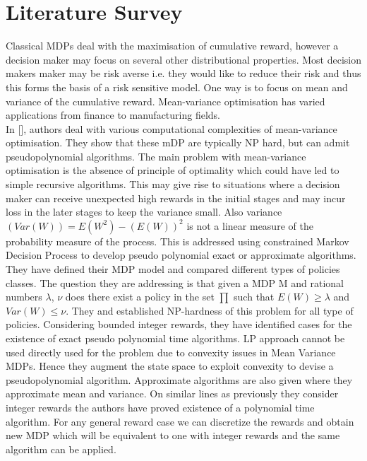 \documentclass[10pt,a4paper,oneside]{report}
\begin{document}
\chapter{Literature Survey}


\noindent Classical MDPs deal with the maximisation of cumulative reward, however a decision maker may focus on several other distributional properties. Most decision makers maker may be risk averse i.e. they would like to reduce their risk and thus this forms the basis of a risk sensitive model. 
One way is to focus on mean and variance of the cumulative reward. Mean-variance optimisation has varied applications from finance to manufacturing fields.\\

In [], authors deal with various computational complexities of mean-variance optimisation. They show that these mDP are typically NP hard, but can admit pseudopolynomial algorithms.  The main problem with mean-variance optimisation is the absence of principle of optimality which could have led to simple recursive algorithms. This may give rise to situations where a decision maker can receive unexpected high rewards in the initial stages and may incur loss in the later stages to keep the variance small.  Also variance $ (Var(W))=E(W^2)- (E(W))^2$ is not a linear measure of the probability measure of the process. This is addressed using constrained Markov Decision Process to develop pseudo polynomial exact or approximate algorithms. They have defined their MDP model and compared different types of policies classes. The question they are addressing is that given a MDP M and rational numbers $\lambda$, $\nu$ does there exist a policy in the set $\prod$ such that $E(W)\geq \lambda$ and $Var(W)\leq \nu$. They  and established NP-hardness of this problem for all type of policies. Considering bounded integer rewards, they have identified cases for the existence of exact pseudo polynomial time algorithms. LP approach cannot be used directly used for the problem due to convexity issues in Mean Variance MDPs. Hence they augment the state space to exploit convexity to devise a pseudopolynomial algorithm.  Approximate algorithms are also given where they approximate mean and variance. On similar lines as previously they consider integer rewards the authors have proved existence of a polynomial time algorithm. For any general reward case we can discretize the rewards and obtain new MDP which will be equivalent to one with integer rewards and the same algorithm can be applied.\\
\end{document}
